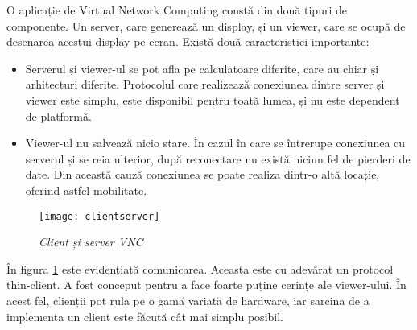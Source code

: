 %
%
%
%
%
%

O aplicație de Virtual Network Computing constă din două tipuri de componente. Un server, care generează un display, și un viewer, care se ocupă de desenarea acestui display pe ecran. Există două caracteristici importante:



\begin{itemize}
  \item Serverul și viewer-ul se pot afla pe calculatoare diferite, care au chiar și arhitecturi diferite. Protocolul care realizează conexiunea dintre server și viewer este simplu, este disponibil pentru toată lumea, și nu este dependent de platformă.
  \item Viewer-ul nu salvează nicio stare. În cazul în care se întrerupe conexiunea cu serverul și se reia ulterior, după reconectare nu există niciun fel de pierderi de date. Din această cauză conexiunea se poate realiza dintr-o altă locație, oferind astfel mobilitate.
\end{itemize}

\begin{figure}
    \centering
    \texttt{[image: clientserver]}
    \caption{\textit{Client și server VNC}}
    \label{vncclsrv}
\end{figure}

În figura \ref{vncclsrv} este evidențiată comunicarea. Aceasta este cu adevărat un protocol thin-client. A fost conceput pentru a face foarte puține cerințe ale viewer-ului. În acest fel, clienții pot rula pe o gamă variată de hardware, iar sarcina de a implementa un client este făcută cât mai simplu posibil.

